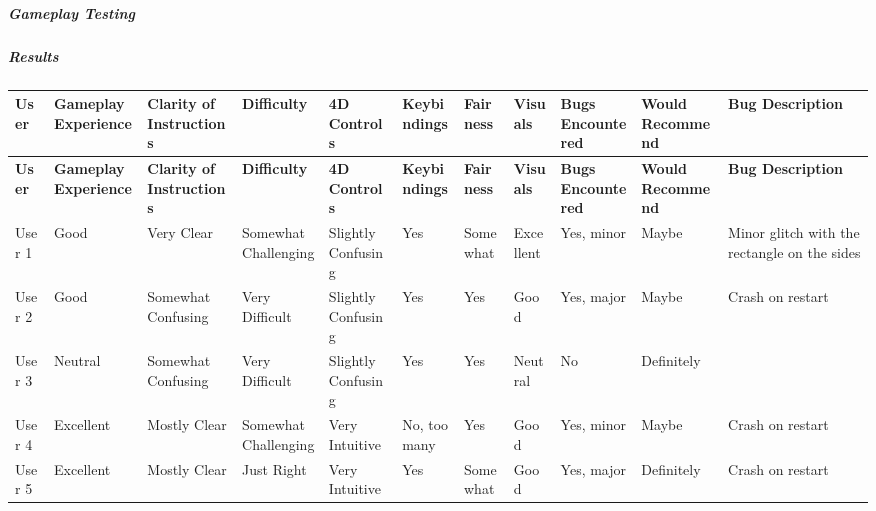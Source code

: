 \documentclass{article}
\begin{document}
\subparagraph{Gameplay Testing}


\begin{landscape}
\subparagraph{Results}
\begingroup\tiny 
    \begin{longtable}{lllllllllll}
    \toprule
    \textbf{User} & \textbf{Gameplay Experience} & \textbf{Clarity of Instructions} & \textbf{Difficulty} & \textbf{4D Controls} & \textbf{Keybindings} & \textbf{Fairness} & \textbf{Visuals} & \textbf{Bugs Encountered} & \textbf{Would Recommend} & \textbf{Bug Description} \\
    \midrule
    \endfirsthead
    \toprule
    \textbf{User} & \textbf{Gameplay Experience} & \textbf{Clarity of Instructions} & \textbf{Difficulty} & \textbf{4D Controls} & \textbf{Keybindings} & \textbf{Fairness} & \textbf{Visuals} & \textbf{Bugs Encountered} & \textbf{Would Recommend} & \textbf{Bug Description} \\
    \midrule
    \endhead
    User 1 & Good & Very Clear & Somewhat Challenging & Slightly Confusing & Yes & Somewhat & Excellent & Yes, minor & Maybe & Minor glitch with the rectangle on the sides \\
    User 2 & Good & Somewhat Confusing & Very Difficult & Slightly Confusing & Yes & Yes & Good & Yes, major & Maybe & Crash on restart \\
    User 3 & Neutral & Somewhat Confusing & Very Difficult & Slightly Confusing & Yes & Yes & Neutral & No & Definitely &  \\
    User 4 & Excellent & Mostly Clear & Somewhat Challenging & Very Intuitive & No, too many & Yes & Good & Yes, minor & Maybe & Crash on restart \\
    User 5 & Excellent & Mostly Clear & Just Right & Very Intuitive & Yes & Somewhat & Good & Yes, major & Definitely & Crash on restart \\
    \bottomrule
    \end{longtable}
\endgroup
\end{landscape}
\end{document}
